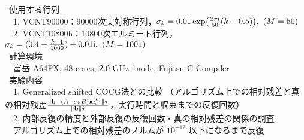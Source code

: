 

\textcolor{structure.fg}{\textbullet} \ 使用する行列\cite{ref-ELSES-matrix}\\
	　1. VCNT90000：$90000$次実対称行列，$\sigma_k = 0.01 \exp(\frac{2 \pi \i}{50}(k-0.5)),\ (M=50)$\\
	　2. VCNT10800h：$10800$次エルミート行列，$\sigma_k =(0.4+\frac{k-1}{1000}) + 0.01\i,\ (M=1001)$\\
\textcolor{structure.fg}{\textbullet} \ 計算環境\\
	　富岳 A64FX, 48 cores, 2.0 GHz 1node, Fujitsu C Compiler\\
\textcolor{structure.fg}{\textbullet} \ 実験内容\\
	　1. Generalized shifted COCG法との比較
	（アルゴリズム上での相対残差と真の相対残差$\frac{\|\vb{b}-(A+\sigma_{k}B)\vb{x}_{n}^{(k)}\|_2}{\|\vb{b}\|_2}$，実行時間と収束までの反復回数）\\
	　2. 内部反復の精度と外部反復の反復回数・真の相対残差の関係の調査\\
	　アルゴリズム上での相対残差のノルムが $10^{-12}$ 以下になるまで反復

%
%


\begin{comment}

\begin{itemize}
	\item 使用する行列\\
		1. VCNT90000：$90000$次実対称行列\\
		2. VCNT10800h：$10800$次エルミート行列
	\item 計算環境\\
		富岳 A64FX, 48 cores, 2.0 GHz 1node, Fujitsu C Compiler
	\item 実験内容\\
		1. Generalized shifted COCG法との比較（相対残差$\frac{\|\vb{b}-(A+\sigma_{k}B)\vb{x}_{n}^{(k)}\|_2}{\|\vb{b}\|_2}$，実行時間）\\
		2. 内部反復の精度と外部反復の反復回数・真の相対残差の関係の調査
\end{itemize}

\end{comment}


